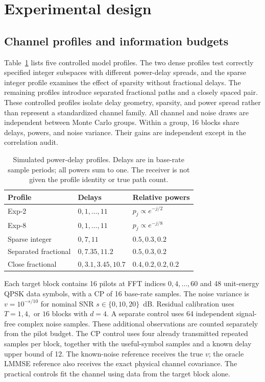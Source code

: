 \section{Experimental design}
\label{sec:experiments}

\subsection{Channel profiles and information budgets}
Table~\ref{tab:profiles} lists five controlled model profiles. The two dense
profiles test correctly specified integer subspaces with different power-delay
spreads, and the sparse integer profile examines the effect of sparsity without
fractional delays. The remaining profiles introduce separated fractional paths
and a closely spaced pair. These controlled profiles isolate delay geometry,
sparsity, and power spread rather than represent a standardized channel family.
All channel and noise draws are independent between Monte Carlo groups.
Within a group, 16 blocks share delays, powers, and noise variance. Their gains
are independent except in the correlation audit.

\begin{table}[t]
\centering
\caption{Simulated power-delay profiles. Delays are in base-rate sample periods;
all powers sum to one. The receiver is not given the profile identity or true
path count.}
\label{tab:profiles}
\small
\begin{tabular}{lll}
\toprule
Profile & Delays & Relative powers \\
\midrule
Exp-2 & $0,1,\ldots,11$ & $p_j\propto e^{-j/2}$ \\
Exp-8 & $0,1,\ldots,11$ & $p_j\propto e^{-j/8}$ \\
Sparse integer & $0,7,11$ & $0.5,0.3,0.2$ \\
Separated fractional & $0,7.35,11.2$ & $0.5,0.3,0.2$ \\
Close fractional & $0,3.1,3.45,10.7$ & $0.4,0.2,0.2,0.2$ \\
\bottomrule
\end{tabular}
\end{table}

Each target block contains 16 pilots at FFT indices $0,4,\ldots,60$ and 48 unit-energy
QPSK data symbols, with a CP of 16 base-rate samples. The noise variance is
$v=10^{-s/10}$ for nominal SNR $s\in\{0,10,20\}$~dB. Residual calibration
uses $T=1,4,$ or $16$ blocks with $d=4$. A separate control uses 64 independent
signal-free complex noise samples. These additional observations are counted
separately from the pilot budget. The CP control
uses four already transmitted repeated samples per block, together with the
useful-symbol samples and a known delay upper bound of 12. The known-noise
reference receives the true $v$; the oracle LMMSE reference also receives
the exact physical channel covariance. The practical controls fit the channel
using data from the target block alone.


